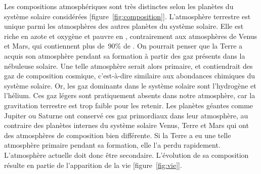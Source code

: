 
\sk
Les compositions atmosphériques sont très distinctes selon les planètes du système solaire considérées [figure~\ref{fig:composition}]. L'atmosphère terrestre est unique parmi les atmosphères des autres planètes du système solaire. Elle est riche en azote et oxygène et pauvre en \carb, contrairement aux atmosphères de Venus et Mars, qui contiennent plus de~$90\%$ de \carb. On pourrait penser que la Terre a acquis son atmosphère pendant sa formation à partir des gaz présents dans la nébuleuse solaire. Une telle atmosphère serait alors primaire, et contiendrait des gaz de composition cosmique, c'est-à-dire similaire aux abondances chimiques du système solaire. Or, les gaz dominants dans le système solaire sont l'hydrogène et l'hélium. Ces gaz légers sont pratiquement absents dans notre atmosphère, car la gravitation terrestre est trop faible pour les retenir. Les planètes géantes comme Jupiter ou Saturne ont conservé ces gaz primordiaux dans leur atmosphère, au contraire des planètes internes du système solaire Venus, Terre et Mars qui ont des atmosphères de composition bien différente. Si la Terre a eu une telle atmosphère primaire pendant sa formation, elle l'a perdu rapidement. L'atmosphère actuelle doit donc être secondaire. L'évolution de sa composition résulte en partie de l'apparition de la vie [figure~\ref{fig:vie}].

